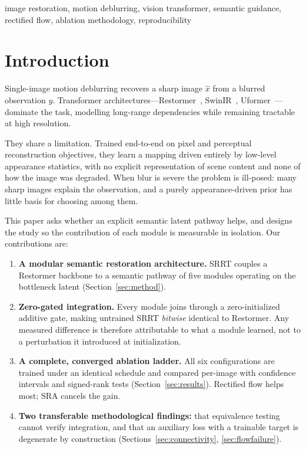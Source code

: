 \documentclass[conference]{IEEEtran}
\newcommand{\bs}[1]{\textbf{#1}}
\begin{document}
\begin{IEEEkeywords}
image restoration, motion deblurring, vision transformer, semantic guidance,
rectified flow, ablation methodology, reproducibility
\end{IEEEkeywords}

\section{Introduction}

Single-image motion deblurring recovers a sharp image $\hat{x}$ from a blurred
observation $y$. Transformer architectures---Restormer~\cite{restormer},
SwinIR~\cite{swinir}, Uformer~\cite{uformer}---dominate the task, modelling
long-range dependencies while remaining tractable at high resolution.

They share a limitation. Trained end-to-end on pixel and perceptual
reconstruction objectives, they learn a mapping driven entirely by low-level
appearance statistics, with no explicit representation of scene content and
none of how the image was degraded. When blur is severe the problem is
ill-posed: many sharp images explain the observation, and a purely
appearance-driven prior has little basis for choosing among them.

This paper asks whether an explicit semantic latent pathway helps, and designs
the study so the contribution of each module is measurable in isolation. Our
contributions are:

\begin{enumerate}
\item \bs{A modular semantic restoration architecture.} SRRT couples a
Restormer backbone to a semantic pathway of five modules operating on the
bottleneck latent (Section~\ref{sec:method}).

\item \bs{Zero-gated integration.} Every module joins through a
zero-initialized additive gate, making untrained SRRT \emph{bitwise} identical
to Restormer. Any measured difference is therefore attributable to what a
module learned, not to a perturbation it introduced at initialization.

\item \bs{A complete, converged ablation ladder.} All six configurations are
trained under an identical schedule and compared per-image with confidence
intervals and signed-rank tests (Section~\ref{sec:results}). Rectified flow
helps most; SRA cancels the gain.

\item \bs{Two transferable methodological findings:} that equivalence testing
cannot verify integration, and that an auxiliary loss with a trainable target
is degenerate by construction (Sections~\ref{sec:connectivity},
\ref{sec:flowfailure}).
\end{enumerate}
\end{document}

